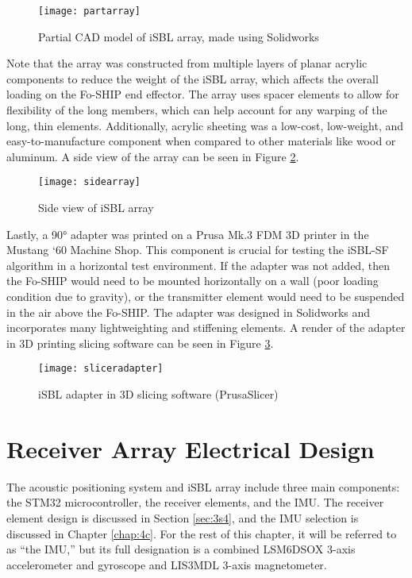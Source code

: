 \documentclass[11pt]{ucthesisCP}
\begin{document}
\begin{figure}[htbp]
	\centering
	\texttt{[image: partarray]}
	\caption{Partial CAD model of iSBL array, made using Solidworks}
	\label{fig:partarray}
\end{figure}

Note that the array was constructed from multiple layers of planar acrylic components to reduce the weight of the iSBL array, which affects the overall loading on the Fo-SHIP end effector. The array uses spacer elements to allow for flexibility of the long members, which can help account for any warping of the long, thin elements. Additionally, acrylic sheeting was a low-cost, low-weight, and easy-to-manufacture component when compared to other materials like wood or aluminum. A side view of the array can be seen in Figure \ref{fig:sidearray}.

\begin{figure}[htbp]
	\centering
	\texttt{[image: sidearray]}
	\caption{Side view of iSBL array}
	\label{fig:sidearray}
\end{figure}

Lastly, a 90° adapter was printed on a Prusa Mk.3 FDM 3D printer in the Mustang ‘60 Machine Shop. This component is crucial for testing the iSBL-SF algorithm in a horizontal test environment. If the adapter was not added, then the Fo-SHIP would need to be mounted horizontally on a wall (poor loading condition due to gravity), or the transmitter element would need to be suspended in the air above the Fo-SHIP. The adapter was designed in Solidworks and incorporates many lightweighting and stiffening elements. A render of the adapter in 3D printing slicing software can be seen in Figure \ref{fig:sliceradapter}.

\begin{figure}[htbp]
	\centering
	\texttt{[image: sliceradapter]}
	\caption{iSBL adapter in 3D slicing software (PrusaSlicer)}
	\label{fig:sliceradapter}
\end{figure}

\section{Receiver Array Electrical Design} \label{3s3}
The acoustic positioning system and iSBL array include three main components: the STM32 microcontroller, the receiver elements, and the IMU. The receiver element design is discussed in Section \ref{sec:3s4}, and the IMU selection is discussed in Chapter \ref{chap:4c}. For the rest of this chapter, it will be referred to as “the IMU,” but its full designation is a combined LSM6DSOX 3-axis accelerometer and gyroscope and LIS3MDL 3-axis magnetometer.
\end{document}
